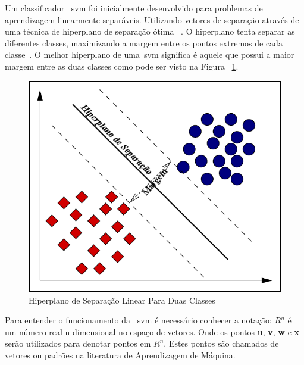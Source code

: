 Um classificador ~\ac{svm} foi inicialmente desenvolvido para problemas de aprendizagem linearmente separáveis. Utilizando vetores de separação através de uma técnica de hiperplano de separação ótima ~\cite{vapnik95}. O hiperplano tenta separar as diferentes classes, maximizando a margem entre os pontos extremos de cada classe~\cite{svm-cg-2002}. O melhor hiperplano de uma~\ac{svm} significa é aquele que possui a maior margem entre as duas classes como pode ser visto na Figura ~\ref{fig:hiperplano}.  

\begin{figure}
 \centering
 \includegraphics[scale=0.4]{./img/svmhyperplane.png}
\caption{Hiperplano de Separação Linear Para Duas Classes}
 \label{fig:hiperplano}
\end{figure}


Para entender o funcionamento da ~\ac{svm} é necessário conhecer a notação:
\begin{math}
R^{n}
\end{math}
é um número real n-dimensional no espaço de vetores. Onde os pontos \textbf{u}, \textbf{v}, \textbf{w} e \textbf{x} serão utilizados para denotar pontos em 
\begin{math}
R^{n}
\end{math}.
Estes pontos são chamados de vetores ou padrões na literatura de Aprendizagem de Máquina.

